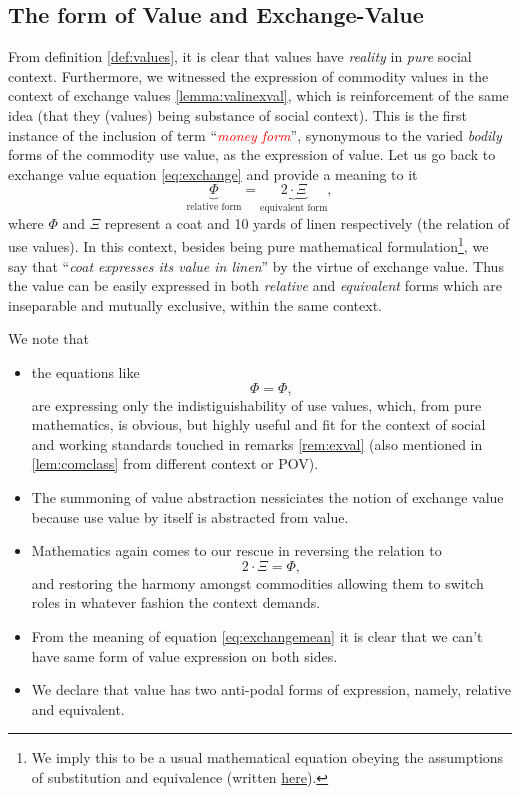 \documentclass[12pt]{extarticle}
\theoremstyle{definition}
\newenvironment{remark}[1][Remark]{\begin{trivlist}
\item[\hskip \labelsep {\bfseries #1}]}{\end{trivlist}}
\begin{document}
\subsection{The form of Value and Exchange-Value}
From definition \ref{def:values}, it is clear that values have \emph{reality} in \emph{pure} social context.  Furthermore, we witnessed the expression of commodity values in the context of exchange values \ref{lemma:valinexval}, which is reinforcement of the same idea (that they (values) being substance of social context).  This is the first instance of the inclusion of term ``\emph{\textcolor{red}{money form}}'', synonymous to the varied \emph{bodily} forms of the commodity use value,  as the expression of value.  Let us go back to exchange value equation \ref{eq:exchange} and provide a meaning to it
\begin{equation}
  \label{eq:exchangemean}
  \underbrace{\Phi}_{\text{relative form}} = \underbrace{2\cdot\Xi}_{\text{equivalent form}},
\end{equation}
where $\Phi$ and $\Xi$ represent a coat and 10 yards of linen respectively (the relation of use values).  In this context, besides being pure mathematical formulation\footnote{We imply this to be a usual mathematical equation obeying the assumptions of substitution and equivalence (written \href{https://en.wikipedia.org/wiki/Equality_(mathematics)\#Basic_properties}{here}).}, we say that ``\emph{coat expresses its value in linen}'' by the virtue of exchange value.  Thus the value can be easily expressed in both \emph{relative} and \emph{equivalent} forms which are inseparable and mutually exclusive, within the same context.

\begin{remark}
  We note that
  \begin{itemize}
\item the equations like
\begin{equation}
  \label{eq:tuto}
  \Phi = \Phi,
\end{equation}
are expressing only the indistiguishability of use values, which, from pure mathematics, is obvious, but highly useful and fit for the context of social and working standards touched in remarks \ref{rem:exval} (also mentioned in \ref{lem:comclass} from different context or POV).
\item The summoning of value abstraction nessiciates the notion of exchange value because use value by itself is abstracted from value.
\item Mathematics again comes to our rescue in reversing the relation to
  \begin{equation}
    2\cdot\Xi = \Phi,
  \end{equation}
  and restoring the harmony amongst commodities allowing them to switch roles in whatever fashion the context demands.
  \item From the meaning of equation \ref{eq:exchangemean} it is clear that we can't have same form of value expression on both sides.
  \item We declare that value has two anti-podal forms of expression, namely, relative and equivalent.
\end{itemize}
\end{remark}
\end{document}

